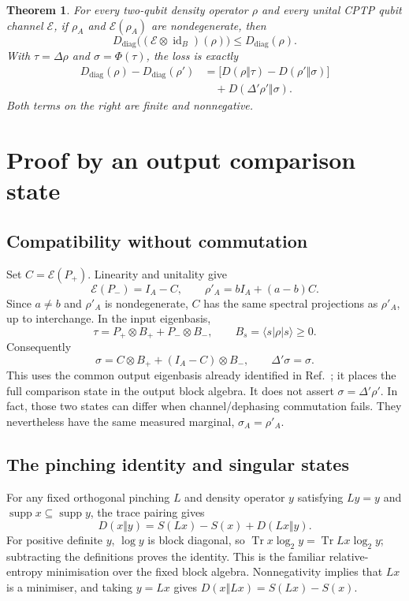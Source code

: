 \documentclass[12pt]{article}
\newcommand{\Tr}{\operatorname{Tr}}
\newcommand{\supp}{\operatorname{supp}}
\newcommand{\id}{\operatorname{id}}
\newcommand{\dd}{D_{\mathrm{diag}}}
\newtheorem{theorem}{Theorem}
\begin{document}
\begin{theorem}\label{thm:main}
For every two-qubit density operator $\rho$ and every unital CPTP qubit channel $\mathcal E$, if $\rho_A$ and $\mathcal E(\rho_A)$ are nondegenerate, then
\begin{equation}
 \dd\bigl((\mathcal E\otimes\id_B)(\rho)\bigr)\leq\dd(\rho).
 \label{eq:main}
\end{equation}
With $\tau=\Delta\rho$ and $\sigma=\Phi(\tau)$, the loss is exactly
\begin{align}
 \dd(\rho)-\dd(\rho')
 &=\bigl[D(\rho\Vert\tau)-D(\rho'\Vert\sigma)\bigr]
 \nonumber\\
 &\quad+D(\Delta'\rho'\Vert\sigma).
 \label{eq:loss}
\end{align}
Both terms on the right are finite and nonnegative.
\end{theorem}

\section{Proof by an output comparison state}
\subsection{Compatibility without commutation}
Set $C=\mathcal E(P_+)$. Linearity and unitality give
\begin{equation}
 \mathcal E(P_-)=I_A-C,\qquad
 \rho'_A=bI_A+(a-b)C.
 \label{eq:affine}
\end{equation}
Since $a\ne b$ and $\rho'_A$ is nondegenerate, $C$ has the same spectral projections as $\rho'_A$, up to interchange. In the input eigenbasis,
\begin{equation}
 \tau=P_+\otimes B_+ +P_-\otimes B_-,\qquad
 B_s=\langle s|\rho|s\rangle\geq0.
\end{equation}
Consequently
\begin{equation}
 \sigma=C\otimes B_+ +(I_A-C)\otimes B_-,\qquad
 \Delta'\sigma=\sigma.
 \label{eq:compatibility}
\end{equation}
This uses the common output eigenbasis already identified in Ref.~\cite{Liu2019}; it places the full comparison state in the output block algebra. It does not assert $\sigma=\Delta'\rho'$. In fact, those two states can differ when channel/dephasing commutation fails. They nevertheless have the same measured marginal, $\sigma_A=\rho'_A$.

\subsection{The pinching identity and singular states}
For any fixed orthogonal pinching $L$ and density operator $y$ satisfying $Ly=y$ and $\supp x\subseteq\supp y$, the trace pairing gives
\begin{equation}
 D(x\Vert y)=S(Lx)-S(x)+D(Lx\Vert y).
 \label{eq:pythagorean}
\end{equation}
For positive definite $y$, $\log y$ is block diagonal, so
$\Tr x\log_2 y=\Tr Lx\log_2 y$; subtracting the definitions proves the identity. This is the familiar relative-entropy minimisation over the fixed block algebra. Nonnegativity implies that $Lx$ is a minimiser, and taking $y=Lx$ gives $D(x\Vert Lx)=S(Lx)-S(x)$.
\end{document}
